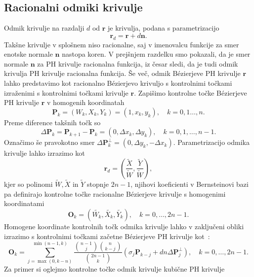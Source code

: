 \documentclass[isrm2, tisk]{fmfdelo}
\newcommand{\mycomment}[1]{\textbf{\textcolor{red}{#1}}}
\begin{document}
    \subsection{Racionalni odmiki krivulje}
    Odmik krivulje na razdalji $d$ od $\mathbf{r}$ je krivulja, podana s parametrizacijo \[\mathbf{r}_d=\mathbf{r} + d\mathbf{n}.\]
    Takšne krivulje v splošnem niso racionalne, saj v imenovalcu funkcije za smer enotske normale $\mathbf{n}$ nastopa koren.
    V prejšnjem razdelku smo pokazali, da je smer normale $\mathbf{n}$ za PH krivulje racionalna funkcija, iz česar sledi, da je tudi odmik krivulja PH krivulje racionalna funkcija.
    Še več, odmik Bézierjeve PH krivulje $\mathbf{r}$ lahko predstavimo kot racionalno Bézierjevo krivuljo s kontrolnimi točkami izraženimi s kontrolnimi točkami krivulje $\mathbf{r}$.
    Zapišimo kontrolne točke Bézierjeve PH krivulje $\mathbf{r}$ v homogenih koordinatah
    \[\mathbf{P}_k = (W_k,X_k,Y_k) = (1,x_k,y_k), \quad k=0,1\ldots,n. \]
    Preme diference takšnih točk so
    \[\Delta\mathbf{P}_k = \mathbf{P}_{k+1}-\mathbf{P}_k = (0,\Delta x_k,\Delta y_k), \quad k=0,1,\ldots,n-1.\]
    Označimo še pravokotno smer $\Delta\mathbf{P}_k^{\perp} =  (0,\Delta y_k, -\Delta x_k)$.
    Parametrizacijo odmika krivulje lahko izrazimo kot
    \[\mathbf{r}_d=\left(\frac{\widetilde{X}}{\widetilde{W}}, \frac{\widetilde{Y}}{\widetilde{W}}\right),\]
    kjer so polinomi $\widetilde{W},\widetilde{X}$ in $\widetilde{Y}$ stopnje $2n-1$,
    njihovi koeficienti v Bernsteinovi bazi pa definirajo kontrolne točke racionalne Bézierjeve krivulje s homogenimi koordinatami
    \[\mathbf{O}_k=(\widetilde{W_k},\widetilde{X_k},\widetilde{Y_k}),\quad k=0,\ldots,2n-1.\]
    Homogene koordinate kontrolnih točk odmika krivulje lahko v zaključeni obliki izrazimo s kontrolnimi točkami začetne Bézierjeve PH krivulje kot~\cite{5389848}:
    \[\mathbf{O}_k= \sum_{j=\max(0,k-n)}^{\min(n-1,k)} \frac{\binom{n-1}{j}\binom{n}{k-j} }{\binom{2n-1}{k}}(\sigma_j\mathbf{P}_{k-j} + dn\Delta \mathbf{P}_j^{\perp}),\quad k=0,\ldots,2n-1.        \]
    Za primer si oglejmo kontrolne točke odmik krivulje kubične PH krivulje
\end{document}
